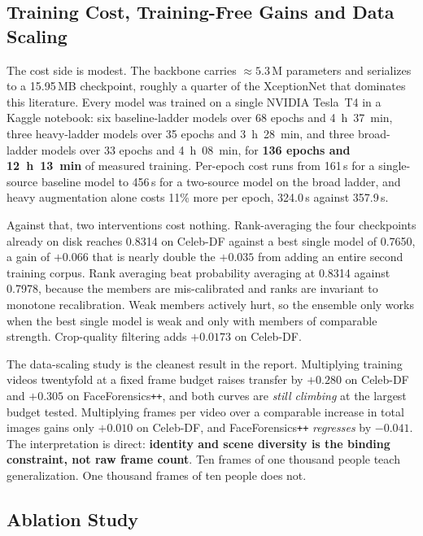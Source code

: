 \documentclass[journal,onecolumn]{IEEEtran}
\newcommand{\celebdf}{Celeb-DF}
\begin{document}
\subsection{Training Cost, Training-Free Gains and Data Scaling}
\label{ssec:scaling}

The cost side is modest. The backbone carries $\approx 5.3$\,M parameters and
serializes to a 15.95\,MB checkpoint, roughly a quarter of the XceptionNet that
dominates this literature. Every model was trained on a single NVIDIA Tesla~T4 in
a Kaggle notebook: six baseline-ladder models over 68 epochs and 4~h~37~min,
three heavy-ladder models over 35 epochs and 3~h~28~min, and three broad-ladder
models over 33 epochs and 4~h~08~min, for \textbf{136 epochs and 12~h~13~min} of
measured training. Per-epoch cost runs from 161\,s for a single-source baseline
model to 456\,s for a two-source model on the broad ladder, and heavy
augmentation alone costs 11\% more per epoch, 324.0\,s against 357.9\,s.

Against that, two interventions cost nothing. Rank-averaging the four checkpoints
already on disk reaches 0.8314 on \celebdf{} against a best single model of
0.7650, a gain of $+0.066$ that is nearly double the $+0.035$ from adding an
entire second training corpus. Rank averaging beat probability averaging at
0.8314 against 0.7978, because the members are mis-calibrated and ranks are
invariant to monotone recalibration. Weak members actively hurt, so the ensemble only
works when the best single model is weak and only with members of comparable strength.
Crop-quality filtering adds $+0.0173$ on \celebdf{}.

The data-scaling study is the cleanest result in the report. Multiplying training
videos twentyfold at a fixed frame budget raises transfer by $+0.280$ on
\celebdf{} and $+0.305$ on FaceForensics\texttt{++}, and both curves are
\emph{still climbing} at the largest budget tested. Multiplying frames per video
over a comparable increase in total images gains only $+0.010$ on \celebdf{}, and
FaceForensics\texttt{++} \emph{regresses} by $-0.041$. The interpretation is
direct: \textbf{identity and scene diversity is the binding constraint, not raw
frame count}. Ten frames of one thousand people teach generalization. One
thousand frames of ten people does not.

\subsection{Ablation Study}
\end{document}
